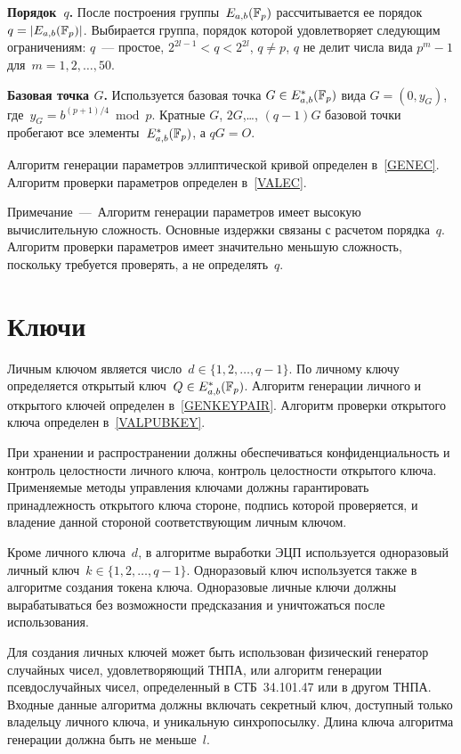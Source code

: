 {\bf Порядок~$q$.}
После построения группы~$E_{a,b}(\mathbb{F}_p)$ рассчитывается 
ее порядок~$q=|E_{a,b}(\mathbb{F}_p)|$.
%
Выбирается группа, порядок которой удовлетворяет следующим ограничениям:
$q$~--- простое,
$2^{2l-1}<q<2^{2l}$,
$q\neq p$,
$q$ не делит числа вида $p^m-1$ для~$m=1,2,\ldots,50$.

{\bf Базовая точка $G$.}
Используется базовая
точка $G\in E_{a,b}^*(\mathbb{F}_p)$ вида $G=(0,y_G)$,
где~$y_G=b^{(p+1)/4}\bmod{p}$.
%
Кратные $G$, $2G$,\ldots, $(q-1)G$ базовой точки
пробегают все элементы~$E_{a,b}^*(\mathbb{F}_p)$, а $qG=O$.

Алгоритм генерации параметров эллиптической кривой определен в~\ref{GENEC}. 
Алгоритм проверки параметров определен в~\ref{VALEC}. 

\begin{note}
Примечание~---~Алгоритм генерации параметров имеет 
высокую вычислительную сложность. 
Основные издержки связаны с расчетом порядка~$q$.
%
Алгоритм проверки параметров имеет значительно меньшую сложность,
поскольку требуется проверять, а не определять~$q$.
\end{note}

\section{Ключи}\label{COMMON.Keys}

Личным ключом является число~$d\in\{1,2,\ldots,q-1\}$.
По личному ключу определяется открытый ключ~$Q\in E_{a,b}^*(\mathbb{F}_p)$.
Алгоритм генерации личного и открытого ключей определен в~\ref{GENKEYPAIR}.
Алгоритм проверки открытого ключа определен в~\ref{VALPUBKEY}.

При хранении и распространении
должны обеспечиваться конфиденциальность и контроль целостности личного 
ключа, контроль целостности открытого ключа.
%
Применяемые методы управления ключами должны 
гарантировать принадлежность открытого ключа стороне, 
подпись которой проверяется, и владение данной стороной 
соответствующим личным ключом.

Кроме личного ключа~$d$, в алгоритме выработки ЭЦП 
используется одноразовый личный ключ~$k\in\{1,2,\ldots,q-1\}$.
Одноразовый ключ используется также в алгоритме создания токена ключа.
Одноразовые личные ключи должны вырабатываться без возможности 
предсказания и уничтожаться после использования.

Для создания личных ключей может быть использован 
физический генератор случайных чисел, удовлетворяющий ТНПА,
или алгоритм генерации псевдослучайных чисел,
определенный в СТБ~34.101.47 или в другом ТНПА. 
Входные данные алгоритма должны включать секретный ключ,
доступный только владельцу личного ключа, и уникальную 
синхропосылку. Длина ключа алгоритма генерации должна быть не меньше~$l$.


